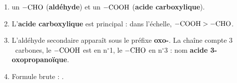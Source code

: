 \documentclass[11pt,a4paper]{article}
\begin{document}
\begin{corrige}
\begin{enumerate}[label=\alph*)]
  \item un $-\ce{CHO}$ (\textbf{aldéhyde}) et un $-\ce{COOH}$ (\textbf{acide carboxylique}).
  \item L'\textbf{acide carboxylique} est principal : dans l'échelle, $-\ce{COOH} > -\ce{CHO}$.
  \item L'aldéhyde secondaire apparaît sous le préfixe \textbf{oxo-}. La chaîne compte $3$~carbones, le $-\ce{COOH}$ est en n$^\circ$1, le $-\ce{CHO}$ en n$^\circ$3 : nom \textbf{acide 3-oxopropanoïque}.
  \item Formule brute : .
\end{enumerate}
\end{corrige}
\end{document}
